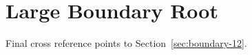 \documentclass{article}
\begin{document}
\section{Large Boundary Root}












Final cross reference points to Section~\ref{sec:boundary-12}.
\end{document}
